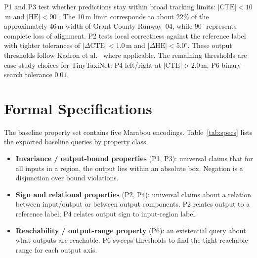 \documentclass[twocolumn,smallextended,runningheads]{svjour3}
\begin{document}
P1 and P3 test whether predictions stay within broad tracking limits: $|\text{CTE}|<10$\,m and $|\text{HE}|<90^\circ$. The 10\,m limit corresponds to about $22\%$ of the approximately 46\,m width of Grant County Runway~04, while $90^\circ$ represents complete loss of alignment. P2 tests local correctness against the reference label with tighter tolerances of $|\Delta\text{CTE}|<1.0$\,m and $|\Delta\text{HE}|<5.0^\circ$. These output thresholds follow Kadron et al.~\cite{kadron2021} where applicable. The remaining thresholds are case-study choices for TinyTaxiNet: P4 left/right at $|\text{CTE}|>2.0$\,m, P6 binary-search tolerance $0.01$.

\section{Formal Specifications}

The baseline property set contains five Marabou encodings. Table~\ref{tab:specs} lists the exported baseline queries by property class.

\begin{itemize}[nosep]
  \item \textbf{Invariance / output-bound properties} (P1, P3): universal claims that for all inputs in a region, the output lies within an absolute box. Negation is a disjunction over bound violations.
  \item \textbf{Sign and relational properties} (P2, P4): universal claims about a relation between input/output or between output components. P2 relates output to a reference label; P4 relates output sign to input-region label.
  \item \textbf{Reachability / output-range property} (P6): an existential query about what outputs are reachable. P6 sweeps thresholds to find the tight reachable range for each output axis.
\end{itemize}
\end{document}
